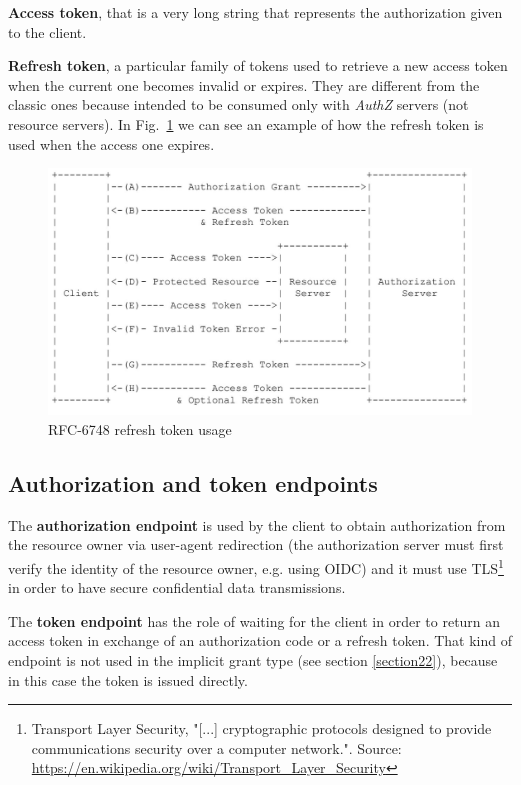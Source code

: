 \textbf{Access token}, that is a very long string that represents the authorization given to the client.

\textbf{Refresh token}, a particular family of tokens used to retrieve a new access token when the current one becomes invalid or expires. They are different from the classic ones because intended to be consumed only with \textit{AuthZ} servers (not resource servers). In Fig.~\ref{fig:refreshtok} we can see an example of how the refresh token is used when the access one expires.



\begin{figure}
    \centering
    \includegraphics[scale=0.5]{chapters/images/chp2/tokenref.jpg}
    \caption{RFC-6748 refresh token usage}
    \label{fig:refreshtok}
\end{figure}

\vspace{1cm}

\subsection{Authorization and token endpoints}
The \textbf{authorization endpoint} is used by the client to obtain authorization from the resource owner via user-agent redirection (the authorization server must first verify the identity of the resource owner, e.g. using OIDC) and it must use TLS\footnote{Transport Layer Security, "[...] cryptographic protocols designed to provide communications security over a computer network.". Source: \url{https://en.wikipedia.org/wiki/Transport_Layer_Security}} in order to have secure confidential data transmissions.

The \textbf{token endpoint} has the role of waiting for the client in order to return an access token in exchange of an authorization code or a refresh token. That kind of endpoint is not used in the implicit grant type (see section \ref{section22}), because in this case the token is issued directly.

